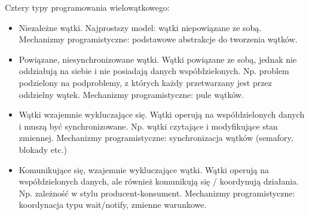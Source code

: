 \documentclass[notheorems, aspectratio=54]{beamer}
\begin{document}
\begin{frame}
Cztery typy programowania wielowątkowego:

\begin{itemize}
\item Niezależne wątki. Najprostszy model: wątki niepowiązane ze sobą. Mechanizmy programistyczne: podstawowe abstrakcje do tworzenia wątków.
\item Powiązane, niesynchronizowane wątki. Wątki powiązane ze sobą, jednak nie oddziałują na siebie i nie posiadają danych współdzielonych. Np. problem podzielony na podproblemy, z których każdy przetwarzany jest przez oddzielny wątek. Mechanizmy programistyczne: pule wątków.
\item Wątki wzajemnie wykluczające się. Wątki operują na współdzielonych danych i muszą być synchronizowane. Np. wątki czytające i modyfikujące stan zmiennej. Mechanizmy programistyczne: synchronizacja wątków (semafory, blokady etc.)
\item Komunikujące się, wzajemnie wykluczające wątki. Wątki operują na współdzielonych danych, ale również komunikują się / koordynują działania. Np. zależność w stylu producent-konsument. Mechanizmy programistyczne: koordynacja typu wait/notify, zmienne warunkowe.
\end{itemize}

\end{frame}
\end{document}
